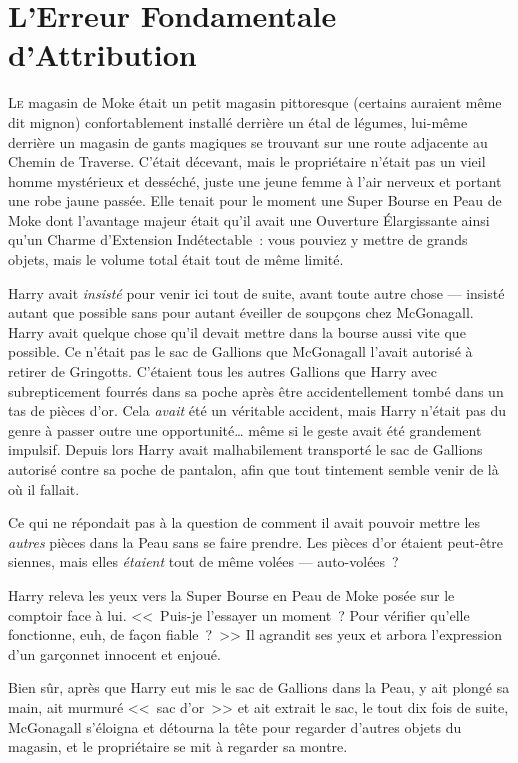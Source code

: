 \chapter{L'Erreur Fondamentale d'Attribution}

\lettrine{L}{e} magasin de Moke était un petit magasin pittoresque (certains auraient même dit mignon) confortablement installé derrière un étal de légumes, lui-même derrière un magasin de gants magiques se trouvant sur une route adjacente au Chemin de Traverse. C'était décevant, mais le propriétaire n'était pas un vieil homme mystérieux et desséché, juste une jeune femme à l'air nerveux et portant une robe jaune passée. Elle tenait pour le moment une Super Bourse en Peau de Moke  dont l'avantage majeur était qu'il avait une Ouverture Élargissante ainsi qu'un Charme d'Extension Indétectable~: vous pouviez y mettre de grands objets, mais le volume total était tout de même limité.

Harry avait \emph{insisté} pour venir ici tout de suite, avant toute autre chose — insisté autant que possible sans pour autant éveiller de soupçons chez McGonagall. Harry avait quelque chose qu'il devait mettre dans la bourse aussi vite que possible. Ce n'était pas le sac de Gallions que McGonagall l'avait autorisé à retirer de Gringotts. C'étaient tous les autres Gallions que Harry avec subrepticement fourrés dans sa poche après être accidentellement tombé dans un tas de pièces d'or. Cela \emph{avait} été un véritable accident, mais Harry n'était pas du genre à passer outre une opportunité… même si le geste avait été grandement impulsif. Depuis lors Harry avait malhabilement transporté le sac de Gallions autorisé contre sa poche de pantalon, afin que tout tintement semble venir de là où il fallait.

Ce qui ne répondait pas à la question de comment il avait pouvoir mettre les \emph{autres} pièces dans la Peau sans se faire prendre. Les pièces d'or étaient peut-être siennes, mais elles \emph{étaient} tout de même volées — auto-volées~?

Harry releva les yeux vers la Super Bourse en Peau de Moke  posée sur le comptoir face à lui. <<~Puis-je l'essayer un moment~? Pour vérifier qu'elle fonctionne, euh, de façon fiable~?~>> Il agrandit ses yeux et arbora l'expression d'un garçonnet innocent et enjoué.

Bien sûr, après que Harry eut mis le sac de Gallions dans la Peau, y ait plongé sa main, ait murmuré <<~sac d'or~>> et ait extrait le sac, le tout dix fois de suite, McGonagall s'éloigna et détourna la tête pour regarder d'autres objets du magasin, et le propriétaire se mit à regarder sa montre.

